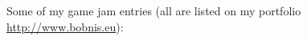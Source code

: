 \documentclass[12pt,a4paper]{article}
\begin{document}
\begin{multicols}{2}

\vfill

\end{multicols}

\vfill

Some of my game jam entries (all are listed on my portfolio {\href{http://www.bobnis.eu}{http://www.bobnis.eu}}):
\end{document}
